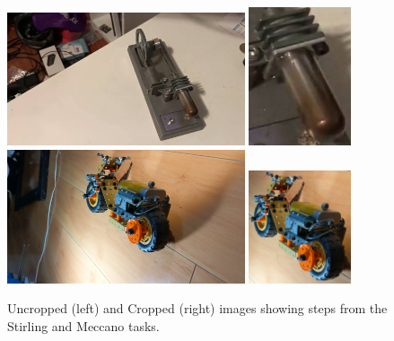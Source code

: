 \begin{figure}
  \includegraphics[width=7cm]{figures/stirling/uncropped.png}
  \includegraphics[width=3cm, left]{figures/stirling/cropped.png}
  \includegraphics[width=7cm]{figures/erector/uncropped.png}
  \includegraphics[width=3cm]{figures/erector/cropped.png}
  \caption{
    Uncropped (left) and Cropped (right) images showing steps from the Stirling
    and Meccano tasks.
  }\label{fig:cropped_uncropped}
\end{figure}

